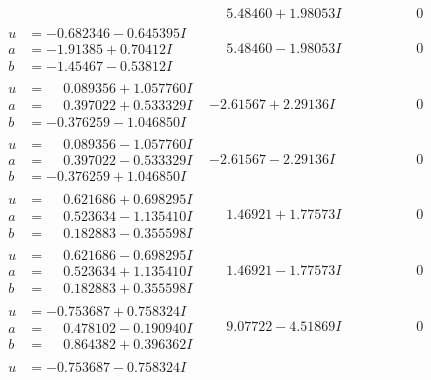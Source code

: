 \documentclass[1p]{elsarticle_modified}
\theoremstyle{definition}
\begin{document}
$$\begin{array}{c|c|c}
 & \phantom{-}5.48460 + 1.98053 I & \phantom{-0.000000 } 0 \\ \hline\begin{aligned}
u &= -0.682346 - 0.645395 I \\
a &= -1.91385 + 0.70412 I \\
b &= -1.45467 - 0.53812 I\end{aligned}
 & \phantom{-}5.48460 - 1.98053 I & \phantom{-0.000000 } 0 \\ \hline\begin{aligned}
u &= \phantom{-}0.089356 + 1.057760 I \\
a &= \phantom{-}0.397022 + 0.533329 I \\
b &= -0.376259 - 1.046850 I\end{aligned}
 & -2.61567 + 2.29136 I & \phantom{-0.000000 } 0 \\ \hline\begin{aligned}
u &= \phantom{-}0.089356 - 1.057760 I \\
a &= \phantom{-}0.397022 - 0.533329 I \\
b &= -0.376259 + 1.046850 I\end{aligned}
 & -2.61567 - 2.29136 I & \phantom{-0.000000 } 0 \\ \hline\begin{aligned}
u &= \phantom{-}0.621686 + 0.698295 I \\
a &= \phantom{-}0.523634 - 1.135410 I \\
b &= \phantom{-}0.182883 - 0.355598 I\end{aligned}
 & \phantom{-}1.46921 + 1.77573 I & \phantom{-0.000000 } 0 \\ \hline\begin{aligned}
u &= \phantom{-}0.621686 - 0.698295 I \\
a &= \phantom{-}0.523634 + 1.135410 I \\
b &= \phantom{-}0.182883 + 0.355598 I\end{aligned}
 & \phantom{-}1.46921 - 1.77573 I & \phantom{-0.000000 } 0 \\ \hline\begin{aligned}
u &= -0.753687 + 0.758324 I \\
a &= \phantom{-}0.478102 - 0.190940 I \\
b &= \phantom{-}0.864382 + 0.396362 I\end{aligned}
 & \phantom{-}9.07722 - 4.51869 I & \phantom{-0.000000 } 0 \\ \hline\begin{aligned}
u &= -0.753687 - 0.758324 I \\

\end{aligned}
\end{array}$$
\end{document}

